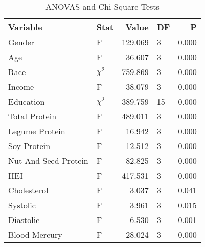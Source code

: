 \begin{table}[h]
\caption{ANOVAS and Chi Square Tests}
\label{tab:anova_table}
\begin{tabular}{llrlr}
\toprule
Variable & Stat & Value & DF & P \\
\midrule
Gender & F & 129.069 & 3 & 0.000 \\
Age & F & 36.607 & 3 & 0.000 \\
Race & $\chi^2$ & 759.869 & 3 & 0.000 \\
Income & F & 38.079 & 3 & 0.000 \\
Education & $\chi^2$ & 389.759 & 15 & 0.000 \\
Total Protein & F & 489.011 & 3 & 0.000 \\
Legume Protein & F & 16.942 & 3 & 0.000 \\
Soy Protein & F & 12.512 & 3 & 0.000 \\
Nut And Seed Protein & F & 82.825 & 3 & 0.000 \\
HEI & F & 417.531 & 3 & 0.000 \\
Cholesterol & F & 3.037 & 3 & 0.041 \\
Systolic & F & 3.961 & 3 & 0.015 \\
Diastolic & F & 6.530 & 3 & 0.001 \\
Blood Mercury & F & 28.024 & 3 & 0.000 \\
\bottomrule
\end{tabular}
\end{table}
